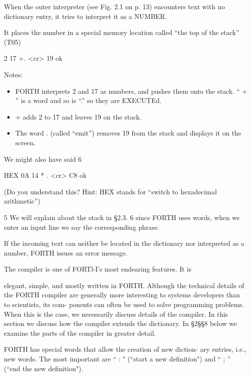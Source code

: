 When the outer interpreter (see Fig. 2.1 on p. 13) encounters text
with no dictionary entry, it tries to interpret it as a NUMBER.



It places the number in a special memory location called “the top
of the stack” (T05)



2 17 +. <cr> 19 ok

Notes:
\begin{itemize}
  \item FORTH interprets 2 and 17 as numbers, and pushes them onto
the stack. “ + ” is a word and so is “.” so they are EXECUTEd.
  \item + adds 2 to 17 and leaves 19 on the stack.


  \item The word . (called “emit”) removes 19 from the stack and 
displays it on the screen.

\end{itemize}

We might also have said 6


HEX 0A 14 * . <cr> C8 ok



(Do you understand this? Hint: HEX stands for “switch to
hexadecimal arithmetic”)





5 We will explain about the stack in §2.3.
6 
since FORTH uses words, when we enter an input line we say the corresponding phrase.



If the incoming text can neither be located in the dictionary nor
interpreted as a number, FORTH issues an error message.






The compiler is one of FORTl-I’s most endearing features. It is

elegant, simple, and mostly written in FORTH. Although the
technical details of the FORTH compiler are generally more
interesting to systems developers than to scientists, its com-
ponents can often be used to solve programming problems. When
this is the case, we necessarily discuss details of the compiler. In
this section we discuss how the compiler extends the dictionary.
In §2§§8 below we examine the parts of the compiler in greater 
detail.

FORTH has special words that allow the creation of new diction-
ary entries, i.e., new words. The most important are “ : " (“start a
new deﬁnition") and “ ; ” (“end the new definition").



